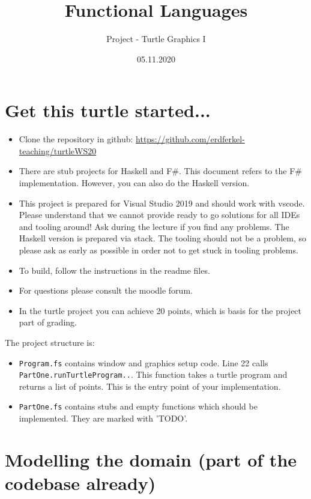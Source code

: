 \documentclass[a4paper]{article}
\title{Functional Languages}
\author{Project - Turtle Graphics I}
\date{05.11.2020}
\begin{document}
\maketitle

\section{Get this turtle started...}

\begin{itemize}
\item Clone the repository in github: \url{https://github.com/erdferkel-teaching/turtleWS20}
\item There are stub projects for Haskell and F\#. This document refers to the F\# implementation. However, you can also
do the Haskell version.
\item This project is prepared for Visual Studio 2019 and should work with vscode. Please understand that we cannot provide ready to go solutions for all IDEs and tooling around! Ask during the lecture if you find any problems.
The Haskell version is prepared via stack. The tooling should not be a problem, so please ask as early as possible in order not to get
stuck in tooling problems.
\item To build, follow the instructions in the readme files.
\item For questions please consult the moodle forum.
\item In the turtle project you can achieve 20 points, which is basis for the project part of grading.
\end{itemize}

The project structure is:
\begin{itemize}
\item \texttt{Program.fs} contains window and graphics setup code. Line 22 calls \texttt{PartOne.runTurtleProgram..}. This function takes
a turtle program and returns a list of points. This is the entry point
of your implementation.
\item \texttt{PartOne.fs} contains stubs and empty functions which should be implemented. They are marked with 'TODO'.
\end{itemize}

\section{Modelling the domain (part of the codebase already)}
\end{document}
